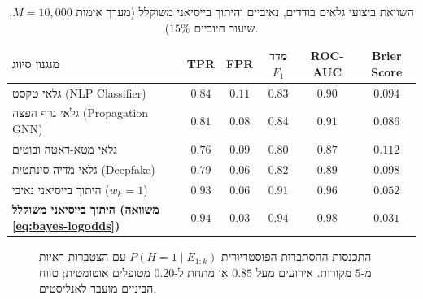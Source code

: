 \begin{table}[htbp]
\centering
\caption{השוואת ביצועי גלאים בודדים, נאיביים והיתוך בייסיאני משוקלל (מערך אימות $M=10{,}000$, שיעור חיוביים $15\%$).}
\label{tab:bayesian-perf}
\begin{tabular}{@{}lccccc@{}}
\toprule
\textbf{מנגנון סיווג} & \textbf{\textenglish{TPR}} & \textbf{\textenglish{FPR}} & \textbf{מדד $F_1$} & \textbf{\textenglish{ROC-AUC}} & \textbf{\textenglish{Brier Score}} \\
\midrule
גלאי טקסט (\textenglish{NLP Classifier}) & $0.84$ & $0.11$ & $0.83$ & $0.90$ & $0.094$ \\
גלאי גרף הפצה (\textenglish{Propagation GNN}) & $0.81$ & $0.08$ & $0.84$ & $0.91$ & $0.086$ \\
גלאי מטא-דאטה ובוטים & $0.76$ & $0.09$ & $0.80$ & $0.87$ & $0.112$ \\
גלאי מדיה סינתטית (\textenglish{Deepfake}) & $0.79$ & $0.06$ & $0.82$ & $0.89$ & $0.098$ \\
היתוך בייסיאני נאיבי ($w_k=1$) & $0.93$ & $0.06$ & $0.91$ & $0.96$ & $0.052$ \\
\textbf{היתוך בייסיאני משוקלל (משוואה \ref{eq:bayes-logodds})} & $\mathbf{0.94}$ & $\mathbf{0.03}$ & $\mathbf{0.94}$ & $\mathbf{0.98}$ & $\mathbf{0.031}$ \\
\bottomrule
\end{tabular}
\end{table}

\begin{figure}[htbp]
\centering
\begin{english}
\end{english}
\caption{התכנסות ההסתברות הפוסטריורית $P(H=1 \mid E_{1:k})$ עם הצטברות ראיות מ-$5$ מקורות. אירועים מעל $0.85$ או מתחת ל-$0.20$ מטופלים אוטומטית; טווח הביניים מועבר לאנליסטים.}
\label{fig:bayesian-convergence}
\end{figure}

